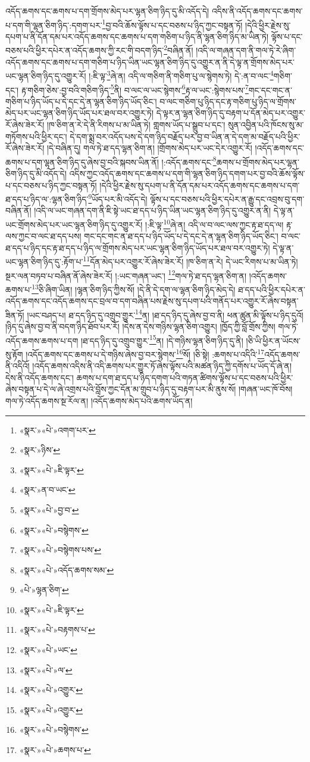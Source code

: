 འདོད་ཆགས་དང་ཆགས་པ་དག་གྲོགས་མེད་པར་ལྷན་ཅིག་ཉིད་དུ་མི་འདོད་དེ། འདིས་ནི་འདོད་ཆགས་དང་ཆགས་པ་དག་གི་ལྷན་ཅིག་ཉིད་:དགག་པར་\footnote{«སྣར་»«པེ་»འགག་པར་}བྱ་བའི་ཆོས་ལྟོས་པ་དང་བཅས་པ་ཉིད་ཀྱང་བསྟན་ཏོ། །དེའི་ཕྱིར་རྗེས་སུ་དཔག་པ་ནི་དོན་དམ་པར་འདོད་ཆགས་དང་ཆགས་པ་དག་གཅིག་པ་ཉིད་ནི་ལྷན་ཅིག་ཉིད་མ་ཡིན་ཏེ། ལྟོས་པ་དང་བཅས་པའི་ཕྱིར་དཔེར་ན་འདོད་ཆགས་ཀྱི་རང་གི་བདག་ཉིད་\footnote{«སྣར་»ཉིས་}བཞིན་ནོ། །འདི་ལ་གཞན་དག་ནི་གལ་ཏེ་རེ་ཞིག་འདོད་ཆགས་དང་ཆགས་པ་དག་གཅིག་པ་ཉིད་ཡིན་ཡང་ལྷན་ཅིག་ཉིད་དུ་འགྱུར་ན་ནི་དེ་ལྟ་ན་གྲོགས་མེད་པར་ཡང་ལྷན་ཅིག་ཉིད་དུ་འགྱུར་རོ། །:ཇི་ལྟ་\footnote{«སྣར་»«པེ་»ཇི་ལྟར་}ཞེ་ན། འདི་ལ་གཅིག་ནི་གཅིག་པུ་ལ་སྙེགས་ཏེ། དེ་:ན་བ་ལང་\footnote{«སྣར་»ན་བ་ཡང་}གཅིག་དང་། རྟ་གཅིག་ཅེས་:བྱ་བའི་གཅིག་ཉིད་\footnote{«སྣར་»«པེ་»བྱ་བ་}ནི། བ་ལང་ལ་ཡང་སྙེགས་\footnote{«སྣར་»«པེ་»བསྙེགས་}རྟ་ལ་ཡང་:སྙེགས་པས་\footnote{«སྣར་»«པེ་»བསྙེགས་པས་}གང་དང་གང་ན་གཅིག་པ་ཉིད་ཡོད་པ་དེ་དང་དེ་ན་ལྷན་ཅིག་ཉིད་ཡོད་ཅིང་། བ་ལང་གཅིག་པུ་ཉིད་དང་རྟ་གཅིག་པུ་ཉིད་ལ་གྲོགས་མེད་པར་ཡང་ལྷན་ཅིག་ཉིད་ཡོད་པར་ཐལ་བར་འགྱུར་ཏེ། དེ་ལྟར་ན་ལྷན་ཅིག་ཉིད་དུ་བརྟག་པ་དོན་མེད་པར་འགྱུར་རོ་ཞེས་ཟེར་རོ། །ཁ་ཅིག་ན་རེ་དེ་ནི་རིགས་པ་མ་ཡིན་ཏེ། གླགས་ཡོད་པ་སྒྲུབ་པ་དང་། སུན་འབྱིན་པའི་ཁོངས་སུ་མ་གཏོགས་པའི་ཕྱིར་དང་། དེ་དག་སྨྲ་བར་འདོད་པས་དེ་དག་ཉིད་བརྗོད་པར་བྱ་བ་ཡིན་ན་དེ་དག་མ་བརྗོད་པའི་ཕྱིར་རོ་ཞེས་ཟེར་རོ། །དེ་བཞིན་དུ། གལ་ཏེ་ཐ་དད་ལྷན་ཅིག་ན། །གྲོགས་མེད་པར་ཡང་དེར་འགྱུར་རོ། །འདོད་ཆགས་དང་ཆགས་པ་དག་ལྷན་ཅིག་ཉིད་དུ་ཞེས་བྱ་བའི་སྐབས་ཡིན་ནོ། །:འདོད་ཆགས་དང་\footnote{«སྣར་»«པེ་»འདོད་ཆགས་སམ་}ཆགས་པ་གྲོགས་མེད་པར་ལྷན་ཅིག་ཉིད་དུ་མི་འདོད་དེ། འདིས་ཀྱང་འདོད་ཆགས་དང་ཆགས་པ་དག་གི་ལྷན་ཅིག་ཉིད་དགག་པར་བྱ་བའི་ཆོས་ལྟོས་པ་དང་བཅས་པ་ཉིད་ཀྱང་བསྟན་ཏོ། །དེའི་ཕྱིར་རྗེས་སུ་དཔག་པ་ནི་དོན་དམ་པར་འདོད་ཆགས་དང་ཆགས་པ་དག་ཐ་དད་པ་ཉིད་ལ་:ལྷན་ཅིག་ཉིད་\footnote{«པེ་»ལྷན་ཅིག་}ཡོད་པར་མི་འདོད་དེ། ལྟོས་པ་དང་བཅས་པའི་ཕྱིར་དཔེར་ན་རྒྱུ་དང་འབྲས་བུ་དག་བཞིན་ནོ། །འདི་ལ་ཡང་གཞན་དག་ནི་ཇི་སྟེ་ཡང་ཐ་དད་པ་ཉིད་ཡིན་ཡང་ལྷན་ཅིག་ཉིད་དུ་འགྱུར་ན་ནི། དེ་ལྟ་ན་ཡང་གྲོགས་མེད་པར་ཡང་ལྷན་ཅིག་ཉིད་དུ་འགྱུར་རོ། །:ཇི་ལྟ་\footnote{«སྣར་»«པེ་»ཇི་ལྟར་}ཞེ་ན། འདི་ལ་བ་ལང་ལས་ཀྱང་རྟ་ཐ་དད་ལ། རྟ་ལས་ཀྱང་བ་ལང་ཐ་དད་པས། གང་དང་གང་ན་ཐ་དད་པ་ཉིད་ཡོད་པ་དེ་དང་དེ་ན་ལྷན་ཅིག་ཉིད་ཡོད་ཅིང་། བ་ལང་ཐ་དད་པ་ཉིད་དང་རྟ་ཐ་དད་པ་ཉིད་ལ་གྲོགས་མེད་པར་ཡང་ལྷན་ཅིག་ཉིད་ཡོད་པར་ཐལ་བར་འགྱུར་ཏེ། དེ་ལྟ་ན་ཡང་ལྷན་ཅིག་ཉིད་དུ་:རྟོག་པ་\footnote{«སྣར་»«པེ་»བརྟགས་པ་}དོན་མེད་པར་འགྱུར་རོ་ཞེས་ཟེར་རོ། །ཁ་ཅིག་ན་རེ། དེ་ཡང་རིགས་པ་མ་ཡིན་ཏེ། སྔར་ལན་བཏབ་པ་བཞིན་ནོ་ཞེས་ཟེར་རོ། །:ཡང་གཞན་ཡང་། \footnote{«སྣར་»«པེ་»ཡང་}གལ་ཏེ་ཐ་དད་ལྷན་ཅིག་ན། །འདོད་ཆགས་ཆགས་པ་\footnote{«སྣར་»«པེ་»ལ་}ཅི་ཞིག་ཡིན། །ལྷན་ཅིག་ཉིད་ཀྱིས་སོ། །དེ་ནི་དེ་དག་ལ་ལྷན་ཅིག་ཉིད་མེད་དེ། ཐ་དད་པའི་ཕྱིར་དཔེར་ན་འདོད་ཆགས་དང་འདོད་ཆགས་དང་བྲལ་བ་དག་བཞིན་པས་རྗེས་སུ་དཔག་པའི་གནོད་པར་འགྱུར་རོ་ཞེས་བསྟན་ཟིན་ཏོ། །ཡང་བཤད་པ། ཐ་དད་ཉིད་དུ་འགྲུབ་གྱུར་\footnote{«སྣར་»«པེ་»འགྱུར་}ན། །ཐ་དད་ཉིད་དུ་ཞེས་བྱ་བ་ནི། ཕན་ཚུན་མི་ལྟོས་པ་ཉིད་དུའོ། །ཉིད་དུ་ཞེས་བྱ་བ་ནི་བདག་ཉིད་ཐོབ་པར་རོ། །དེས་ན་དེས་གཉིས་ལྷན་ཅིག་འགྱུར། །ཁྱོད་ཀྱི་བློ་གྲོས་ཀྱིས། གལ་ཏེ་འདོད་ཆགས་ཆགས་པ་དག །ཐ་དད་ཉིད་དུ་འགྲུབ་གྱུར་\footnote{«སྣར་»«པེ་»འགྱུར་}ན། །དེ་གཉིས་ལྷན་ཅིག་ཉིད་དུ་ནི། །ཅི་ཡི་ཕྱིར་ན་ཡོངས་སུ་རྟོག །འདོད་ཆགས་དང་ཆགས་པ་དེ་གཉིས་ཞེས་བྱ་བར་སྙེགས་\footnote{«སྣར་»«པེ་»བསྙེགས་}སོ། །ཅི་སྟེ། :ཆགས་པ་འདིའི་\footnote{«སྣར་»«པེ་»ཆགས་པ་}འདོད་ཆགས་ནི་འདིའོ། །འདོད་ཆགས་འདིས་ནི་འདི་ཆགས་པར་གྱུར་ཏོ་ཞེས་ལྟོས་པའི་མཚན་ཉིད་ཀྱི་དགོས་པ་ཡོད་དོ་ཞེ་ན། དེས་ནི་འདོད་ཆགས་དང་། ཆགས་པ་དག་ཐ་དད་པ་ཉིད་དགག་པའི་གཏན་ཚིགས་ལྟོས་པ་དང་བཅས་པའི་ཕྱིར་ཞེས་བསྟན་པ་དེ་ལ་ཞེ་འགྲས་པའི་བློས་ཀྱང་དོན་མ་གྲུབ་པ་ཉིད་དུ་བརྟག་པར་མི་ནུས་སོ། །གཞན་ཡང་ཁོ་བོས། གལ་ཏེ་འདོད་ཆགས་སྔ་རོལ་ན། །འདོད་ཆགས་མེད་པའི་ཆགས་ཡོད་ན། 